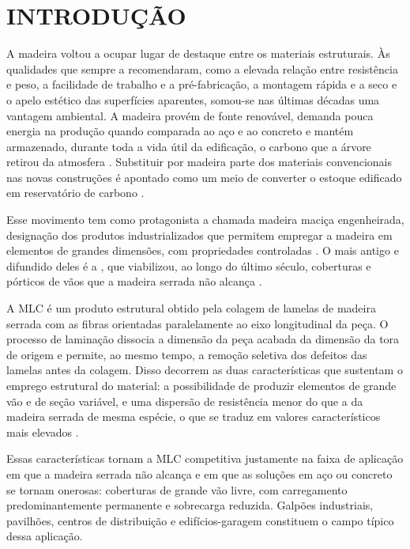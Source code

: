 
\chapter{INTRODUÇÃO}\label{cap:introducao}


A madeira voltou a ocupar lugar de destaque entre os materiais estruturais. Às
qualidades que sempre a recomendaram, como a elevada relação entre resistência e
peso, a facilidade de trabalho e a pré-fabricação, a montagem rápida e a seco e o
apelo estético das superfícies aparentes, somou-se nas últimas décadas uma
vantagem ambiental. A madeira provém de fonte renovável, demanda pouca energia
na produção quando comparada ao aço e ao concreto e mantém armazenado, durante
toda a vida útil da edificação, o carbono que a árvore retirou da atmosfera
\cite{ramage:2017}. Substituir por madeira parte dos materiais convencionais nas
novas construções é apontado como um meio de converter o estoque edificado em
reservatório de carbono \cite{churkina:2020}.

Esse movimento tem como protagonista a chamada madeira maciça engenheirada,
designação dos produtos industrializados que permitem empregar a madeira em
elementos de grandes dimensões, com propriedades controladas
\cite{harte:2017}. O mais antigo e difundido deles é a
, que viabilizou, ao longo do último
século, coberturas e pórticos de vãos que a madeira serrada não alcança
\cite{herzog:2004}.

A MLC é um
produto estrutural obtido pela colagem de lamelas de madeira serrada com as
fibras orientadas paralelamente ao eixo longitudinal da peça. O processo de
laminação dissocia a dimensão da peça acabada da dimensão da tora de origem e
permite, ao mesmo tempo, a remoção seletiva dos defeitos das lamelas antes da
colagem. Disso decorrem as duas características que sustentam o emprego
estrutural do material: a possibilidade de produzir elementos de grande vão e
de seção variável, e uma dispersão de resistência menor do que a da madeira
serrada de mesma espécie, o que se traduz em valores característicos mais
elevados \cite{thelandersson:2003, porteous:2013}.

Essas características tornam a MLC competitiva justamente na faixa de
aplicação em que a madeira serrada não alcança e em que as soluções em aço ou
concreto se tornam onerosas: coberturas de grande vão livre, com carregamento
predominantemente permanente e sobrecarga reduzida. Galpões industriais,
pavilhões, centros de distribuição e edifícios-garagem constituem o campo
típico dessa aplicação.

